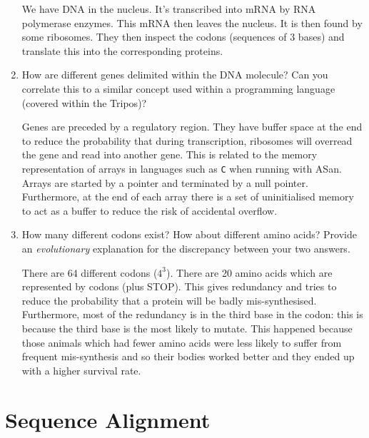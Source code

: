 \documentclass[10pt,\jkfside,a4paper]{article}
\begin{document}
\begin{enumerate}
\begin{itemize}
    \end{itemize}

    We have DNA in the nucleus. It's transcribed into mRNA by RNA polymerase enzymes. This mRNA then leaves the nucleus. It is then found by some ribosomes. They then inspect the codons (sequences of 3 bases)
    and translate this into the corresponding proteins.

    \item How are different genes delimited within the DNA molecule? Can you correlate this to a similar concept used within a programming language (covered within the Tripos)?

    Genes are preceded by a regulatory region. They have buffer space at the end to reduce the probability that during transcription, ribosomes will overread the gene and read into another gene. This is related
    to the memory representation of arrays in languages such as \texttt{C} when running with ASan. Arrays are started by a pointer and terminated by a null pointer. Furthermore, at the end of each array there is
    a set of uninitialised memory to act as a buffer to reduce the risk of accidental overflow.

    \item How many different codons exist? How about different amino acids? Provide an \textit{evolutionary} explanation for the discrepancy between your two answers.

    There are 64 different codons ($4^3$). There are 20 amino acids which are represented by codons (plus STOP). This gives redundancy and tries to reduce the probability that a protein will be badly
    mis-synthesised. Furthermore, most of the redundancy is in the third base in the codon: this is because the third base is the most likely to mutate. This happened because those animals which had fewer amino
    acids were less likely to suffer from frequent mis-synthesis and so their bodies worked better and they ended up with a higher survival rate.

\end{enumerate}

\section{Sequence Alignment}
\end{document}
